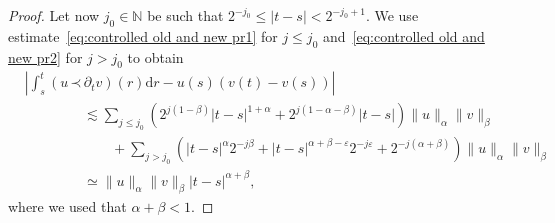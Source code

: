 \documentclass[a4paper,11pt]{article}
\newcommand{\mathd}{\mathrm{d}}
\theoremstyle{remark}
\newcommand{\lpara}{\,\mathord{\prec}\,}
\begin{document}
\begin{proof}
  Let now $j_{0} \in \mathbb{N}$ be such that $2^{-j_{0}} \leqslant | t-s | <2^{-j_{0} +1}$. We use estimate~{\eqref{eq:controlled old and new pr1}} for
  $j \leqslant j_{0}$ and~{\eqref{eq:controlled old and new pr2}} for
  $j>j_{0}$ to obtain
  \begin{align*}
     & \left| \int_{s}^{t} ( u \lpara \partial_{t} v ) ( r ) \mathd r-u ( s ) ( v ( t ) -v ( s ) ) \right| \\
     &\hspace{50pt} \lesssim \sum_{j \leqslant j_{0}} ( 2^{j ( 1 - \beta )} | t-s |^{1+\alpha} +2^{j ( 1- \alpha - \beta )} | t-s | ) \| u \|_{\alpha} \| v \|_{\beta} \\
     &\hspace{50pt}\qquad + \sum_{j>j_{0}} ( |t-s|^\alpha 2^{-j\beta} + | t-s |^{\alpha + \beta - \varepsilon} 2^{-j \varepsilon} +2^{-j (\alpha+\beta)} ) \| u \|_{\alpha} \| v \|_{\beta} \\
     &\hspace{50pt} \simeq \| u \|_{\alpha} \| v \|_{\beta} | t-s |^{\alpha + \beta},
  \end{align*}
  where we used that $\alpha + \beta <1$.
\end{proof}
\end{document}
